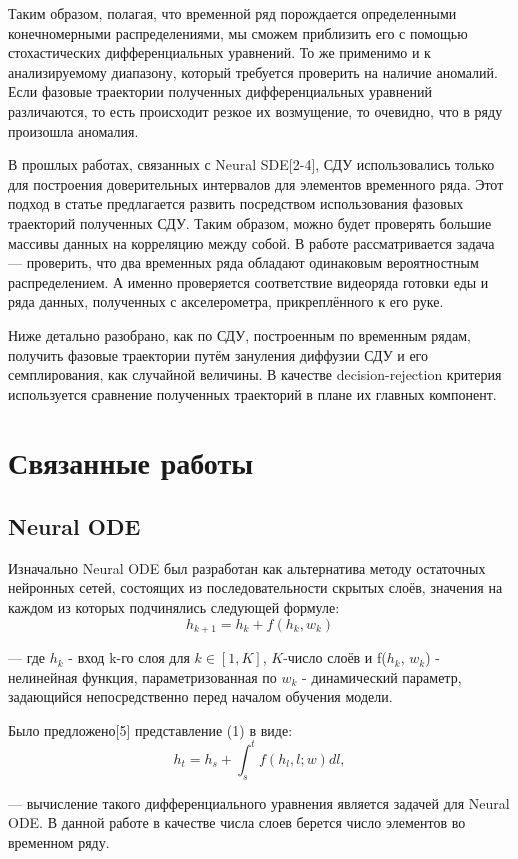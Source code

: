 \documentclass{article}
\begin{document}
   \par Таким образом, полагая, что временной ряд порождается определенными конечномерными распределениями, мы сможем приблизить его с помощью стохастических дифференциальных уравнений. То же применимо и к анализируемому диапазону, который требуется проверить на наличие аномалий. Если фазовые траектории полученных дифференциальных уравнений различаются, то есть происходит резкое их возмущение, то очевидно, что в ряду произошла аномалия.
   \par В прошлых работах, связанных с Neural SDE[2-4], СДУ использовались только для построения доверительных интервалов для элементов временного ряда. Этот подход в статье предлагается развить посредством использования фазовых траекторий полученных СДУ. Таким образом, можно будет проверять большие массивы данных на корреляцию между собой. В работе рассматривается задача --- проверить, что два временных ряда обладают одинаковым вероятностным распределением. А именно проверяется соответствие видеоряда готовки еды и ряда данных, полученных с акселерометра, прикреплённого к его руке.
   \par Ниже детально разобрано, как по СДУ, построенным по временным рядам, получить фазовые траектории путём зануления диффузии СДУ и его семплирования, как случайной величины. В качестве decision-rejection критерия используется сравнение полученных траекторий в плане их главных компонент.

\section{Связанные работы}
  \subsection{Neural ODE}
    \par Изначально Neural ODE был разработан как альтернатива методу остаточных нейронных сетей, состоящих из последовательности скрытых слоёв, значения на каждом из которых подчинялись следующей формуле:
    \begin{equation} h_{k+1} = h_k + f(h_k, w_k)    \end{equation}
    \par --- где $h_k$ - вход k-го слоя для $k \in [1, K]$, $K$-число слоёв и f($h_k$, $w_k$) - нелинейная функция, параметризованная по $w_k$ - динамический параметр, задающийся непосредственно перед началом обучения модели.
    \par Было предложено[5] представление (1) в виде:
    \begin{equation} h_{t} = h_s + \int_s^t f(h_l, l; w) dl,    \end{equation}
    \par --- вычисление такого дифференциального уравнения является задачей для Neural ODE. В данной работе в качестве числа слоев берется число элементов во временном ряду.
\end{document}
